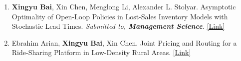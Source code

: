 \documentclass[margin,line]{resume}
\begin{document}
\begin{resume}
\begin{enumerate}[topsep=0pt, leftmargin=*]
 	     \item  \textbf{Xingyu Bai}, Xin Chen, Menglong Li, Alexander L. Stolyar. Asymptotic Optimality of Open-Loop Policies in Lost-Sales Inventory Models with Stochastic Lead Times. \textit{Submitted to, \textbf{Management Science}.} \href{https://papers.ssrn.com/sol3/papers.cfm?abstract_id=4362329}{[Link]}\\   [0.3em]
       
         \item Ebrahim Arian, \textbf{Xingyu Bai}, Xin Chen. Joint Pricing and Routing for a Ride-Sharing Platform in Low-Density Rural Areas.  \href{https://papers.ssrn.com/sol3/papers.cfm?abstract_id=4073828}{[Link]}\\   
 	  \end{enumerate}
 	  
 	  


\end{resume}
\end{document}
